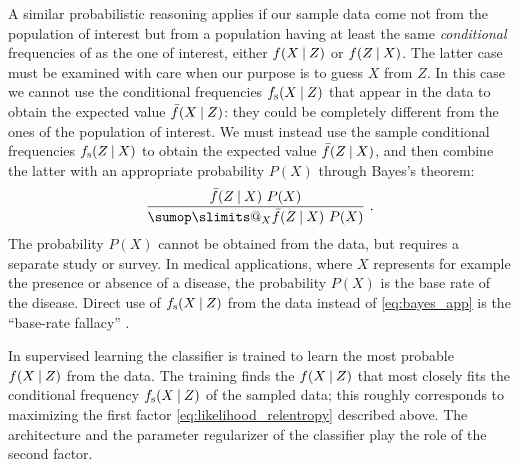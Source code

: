 \documentclass[\ifafour a4paper,12pt,\else a5paper,10pt,\fi%
onecolumn,oneside,article,%
british%
]{memoir}
\makeatletter
\theoremstyle{remark}
\theoremstyle{innote}
\def\sum{\DOTSI\sumop\slimits@}
\renewcommand*{\finalnamedelim}{\addspace\amp\space}
\newcommand*{\amp}{\&}
\renewcommand*{\|}[1][]{\nonscript\:#1\vert\nonscript\:\mathopen{}}
\newcommand*{\sect}{\S}%
\newcommand*{\fs}{f_{\textrm{s}}}
\newcommand*{\uf}{\bar{f}}
\makeatother
\begin{document}
A similar probabilistic reasoning applies if our sample data come not from
the population of interest but from a population having at least the same
\emph{conditional} frequencies of as the one of interest, either
$f(X \| Z)$ or $f(Z \| X)$. The latter case must be examined with care when
our purpose is to guess $X$ from $Z$. In this case we cannot use the
conditional frequencies $\fs(X \| Z)$ that appear in the data to obtain the
expected value $\uf(X \| Z)$: they could be completely different from the
ones of the population of interest. We must instead use the sample
conditional frequencies $\fs(Z \| X)$ to obtain the expected value
$\uf(Z \| X)$, and then combine the latter with an appropriate probability
$P(X)$ through Bayes's theorem:
\begin{equation}
  \label{eq:bayes_app}
  \frac{\uf(Z \| X)\ P(X)}{\sum_{X} \uf(Z \| X)\ P(X)} \ .
\end{equation}
The probability $P(X)$ cannot be obtained from the data, but requires a separate study or survey. In medical applications, where $X$ represents for example the presence or absence of a disease, the probability $P(X)$ is the base rate of the disease. Direct use of $\fs(X \| Z)$ from the data instead of \eqref{eq:bayes_app} is the \enquote{base-rate fallacy} \autocites[\sect~12.5]{russelletal1995_r2022}{axelsson2000,jennyetal2018}.




In supervised learning the classifier is trained to learn the most probable $f(X \| Z)$ from the data. The training finds the $f(X \| Z)$ that most closely fits the conditional frequency $\fs(X \| Z)$ of the sampled data; this roughly corresponds to maximizing the first factor \eqref{eq:likelihood_relentropy} described above. The architecture and the parameter regularizer of the classifier play the role of the second factor.



\renewcommand*{\finalnamedelim}{\addcomma\space}

\printbibliography[prenote=prenote%
]
\end{document}
